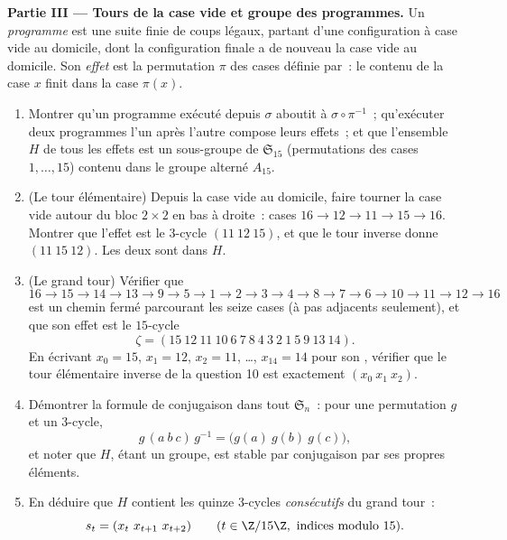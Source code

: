 \begin{problem}
\medskip
\noindent\textbf{Partie III --- Tours de la case vide et groupe des
programmes.} Un \emph{programme} est une suite finie de coups légaux,
partant d'une configuration à case vide au domicile, dont la
configuration finale a de nouveau la case vide au domicile. Son
\emph{effet} est la permutation $\pi$ des cases définie par~: le
contenu de la case $x$ finit dans la case $\pi(x)$.
\begin{enumerate}[resume]
  \item Montrer qu'un programme exécuté depuis $\sigma$ aboutit à
        $\sigma \circ \pi^{-1}$~; qu'exécuter deux programmes l'un
        après l'autre compose leurs effets~; et que l'ensemble $H$ de
        tous les effets est un sous-groupe de $\mathfrak{S}_{15}$
        (permutations des cases $1, \dots, 15$) contenu dans le
        groupe alterné $A_{15}$.
  \item (Le tour élémentaire) Depuis la case vide au domicile, faire
        tourner la case vide autour du bloc $2 \times 2$ en bas à
        droite~: cases $16 \to 12 \to 11 \to 15 \to 16$. Montrer que
        l'effet est le $3$-cycle $(11\ 12\ 15)$, et que le tour
        inverse donne $(11\ 15\ 12)$. Les deux sont dans $H$.
  \item (Le grand tour) Vérifier que
        \[
        16 \to 15 \to 14 \to 13 \to 9 \to 5 \to 1 \to 2 \to 3
        \to 4 \to 8 \to 7 \to 6 \to 10 \to 11 \to 12 \to 16
        \]
        est un chemin fermé parcourant les seize cases (à pas
        adjacents seulement), et que son effet est le $15$-cycle
        \[
        \zeta = (15\ 12\ 11\ 10\ 6\ 7\ 8\ 4\ 3\ 2\ 1\ 5\ 9\ 13\
        14) .
        \]
        En écrivant $x_0 = 15$, $x_1 = 12$, $x_2 = 11$, \dots,
        $x_{14} = 14$ pour son  , vérifier que le tour
        élémentaire inverse de la question 10 est exactement $(x_0\
        x_1\ x_2)$.
  \item Démontrer la formule de conjugaison dans tout
        $\mathfrak{S}_n$~: pour une permutation $g$ et un $3$-cycle,
        \[
        g\,(a\ b\ c)\,g^{-1} = \bigl(g(a)\ g(b)\ g(c)\bigr),
        \]
        et noter que $H$, étant un groupe, est stable par
        conjugaison par ses propres éléments.
  \item En déduire que $H$ contient les quinze $3$-cycles
        \emph{consécutifs} du grand tour~:
        \[
        s_t = (x_t\ x_{t+1}\ x_{t+2}) \qquad (t \in \Z/15\Z,
        \text{ indices modulo } 15).
        \]
\end{enumerate}


\end{problem}
